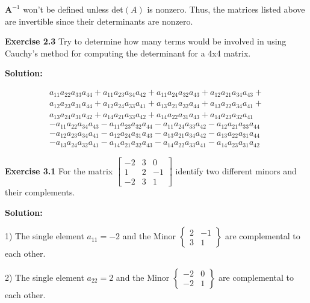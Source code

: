 \documentclass[12pt]{article}
\newcommand{\sol} {\textbf{Solution:}}
\newcommand{\A} {\mathbf{A}}
\begin{document}
\(\A^{-1}\) won't be defined unless det\((A)\) is nonzero.
Thus, the matrices listed above are invertible since their determinants are nonzero.

\pagebreak

\noindent\textbf{Exercise 2.3 }Try to determine how many terms would be
involved in using Cauchy's method for computing the determinant for a 4x4 matrix.

\sol

\[
\begin{matrix}
  a_{11} a_{22} a_{33} a_{44} +
  a_{11} a_{23} a_{34} a_{42} +
  a_{11} a_{24} a_{32} a_{43} +
  a_{12} a_{21} a_{34} a_{43} + \\
  a_{12} a_{23} a_{31} a_{44} +
  a_{12} a_{24} a_{33} a_{41} +
  a_{13} a_{21} a_{32} a_{44} +
  a_{13} a_{22} a_{34} a_{41} + \\
  a_{13} a_{24} a_{31} a_{42} +
  a_{14} a_{21} a_{33} a_{42} +
  a_{14} a_{22} a_{31} a_{43} +
  a_{14} a_{23} a_{32} a_{41} \\
  - a_{11} a_{22} a_{34} a_{43}
  - a_{11} a_{23} a_{32} a_{44}
  - a_{11} a_{24} a_{33} a_{42}
  - a_{12} a_{21} a_{33} a_{44} \\
  - a_{12} a_{23} a_{34} a_{41}
  - a_{12} a_{24} a_{31} a_{43}
  - a_{13} a_{21} a_{34} a_{42}
  - a_{13} a_{22} a_{31} a_{44} \\
  - a_{13} a_{24} a_{32} a_{41}
  - a_{14} a_{21} a_{32} a_{43}
  - a_{14} a_{22} a_{33} a_{41}
  - a_{14} a_{23} a_{31} a_{42}
\end{matrix}
\]

\pagebreak

\noindent\textbf{Exercise 3.1} For the matrix $%
\begin{bmatrix}
-2 & 3 & 0\\
1 & 2 & -1\\
-2 & 3 & 1
\end{bmatrix}
$ identify two different minors and their complements.

\bigskip

\sol

1) The single element \(a_{11} = -2\) and the Minor
\(
\begin{Bmatrix}
2 & -1 \\
3 & 1
\end{Bmatrix}
\)
are complemental to each other.

2) The single element \(a_{22} = 2\) and the Minor
\(
\begin{Bmatrix}
-2 & 0 \\
-2 & 1
\end{Bmatrix}
\)
are complemental to each other.
\end{document}
